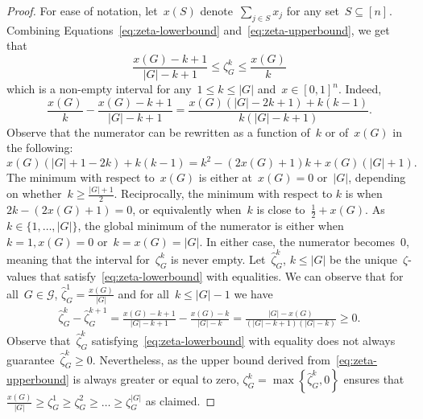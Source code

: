 \documentclass[10pt,a4paper]{amsart}
\newcommand{\brackets}[1]{\left\{ #1 \right\}}
\newcommand{\naturalsto}[2][]{\left[ #2 \right]_{#1}}
\theoremstyle{definition}
\begin{document}
\begin{proof}
  For ease of notation, let~$x(S)$ denote~$\sum_{j\in S} x_j$ for any set~$S\subseteq\naturalsto[]{n}$.
  Combining Equations~\eqref{eq:zeta-lowerbound} and~\eqref{eq:zeta-upperbound}, we get that
  \begin{equation*}
    \frac{x(G) -k + 1}{|G| - k + 1} \leq \zeta^k_G \leq \frac{x(G)}{k}
  \end{equation*}
  which is a non-empty interval for any~$1\leq k\leq |G|$ and~$x\in [0, 1]^n$.
  Indeed,
  \begin{equation*}
    \frac{x(G)}{k} - \frac{x(G) - k + 1}{|G|-k+1} = \frac{x(G)(|G| -2k+1) + k(k-1)}{k(|G|-k+1)}.
  \end{equation*}
  Observe that the numerator can be rewritten as a function of~$k$ or of~$x(G)$ in the following:
  \begin{equation*}
    x(G)\left(|G| + 1 - 2k\right) + k(k-1) = k^2 - (2x(G)+1)k + x(G)(|G|+1).
  \end{equation*}
  The minimum with respect to~$x(G)$ is either at~$x(G) = 0$ or~$|G|$, depending on whether~$k \geq \frac{|G|+1}{2}$. 
  Reciprocally, the minimum with respect to $k$ is when~$2k - (2x(G) + 1) = 0$, or equivalently when~$k$ is close to~$\frac{1}{2} + x(G)$.
  As~$k\in \{1, \dots, |G|\}$, the global minimum of the numerator is either when~$k = 1, x(G) = 0$ or~$k=x(G)=|G|$.
  In either case, the numerator becomes~$0$, meaning that the interval for~$\zeta^k_G$ is never empty.
  Let~$\hat{\zeta}^k_G$, $k\leq |G|$ be the unique~$\zeta$-values that satisfy~\eqref{eq:zeta-lowerbound} with equalities.
  We can observe that for all~$G\in\mathcal{G}$, $\hat{\zeta}^1_G = \frac{x(G)}{|G|}$ and for all~$k\leq|G|-1$ we have
  \begin{align*}
    \hat{\zeta}^k_G - \hat{\zeta}^{k+1}_G = \frac{x(G) - k + 1}{|G| - k + 1} - \frac{x(G) - k}{|G| - k} = \frac{|G| - x(G)}{(|G|-k+1)(|G|-k)} \geq 0.
  \end{align*}
  Observe that~$\hat{\zeta}^k_G$ satisfying~\eqref{eq:zeta-lowerbound} with equality does not always guarantee~$\hat{\zeta}^k_G \geq 0$.
  Nevertheless, as the upper bound derived from~\eqref{eq:zeta-upperbound} is always greater or equal to zero,  $\zeta^k_G = \max\brackets{\hat{\zeta}^k_G, 0}$ ensures that~$\frac{x(G)}{|G|} \geq \zeta^1_G \geq \zeta^2_G \geq \dots \geq \zeta^{|G|}_G$ as claimed.
\end{proof}
\end{document}
